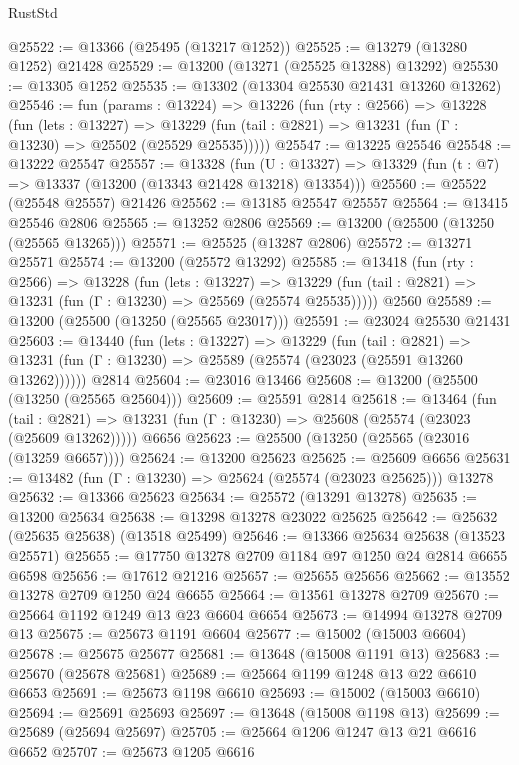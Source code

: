 \begin{lexlean}{RustStd}
\begin{coremodule}
@25522 := @13366 (@25495 (@13217 @1252))
@25525 := @13279 (@13280 @1252) @21428
@25529 := @13200 (@13271 (@25525 @13288) @13292)
@25530 := @13305 @1252
@25535 := @13302 (@13304 @25530 @21431 @13260 @13262)
@25546 := fun (params : @13224) =>
  @13226
    (fun (rty : @2566) =>
    @13228
      (fun (lets : @13227) =>
      @13229 (fun (tail : @2821) => @13231 (fun (Γ : @13230) => @25502 (@25529 @25535)))))
@25547 := @13225 @25546
@25548 := @13222 @25547
@25557 := @13328
    (fun (U : @13327) => @13329 (fun (t : @7) => @13337 (@13200 (@13343 @21428 @13218) @13354)))
@25560 := @25522 (@25548 @25557) @21426
@25562 := @13185 @25547 @25557
@25564 := @13415 @25546 @2806
@25565 := @13252 @2806
@25569 := @13200 (@25500 (@13250 (@25565 @13265)))
@25571 := @25525 (@13287 @2806)
@25572 := @13271 @25571
@25574 := @13200 (@25572 @13292)
@25585 := @13418
    (fun (rty : @2566) =>
    @13228
      (fun (lets : @13227) =>
      @13229 (fun (tail : @2821) => @13231 (fun (Γ : @13230) => @25569 (@25574 @25535)))))
    @2560
@25589 := @13200 (@25500 (@13250 (@25565 @23017)))
@25591 := @23024 @25530 @21431
@25603 := @13440
    (fun (lets : @13227) =>
    @13229
      (fun (tail : @2821) =>
      @13231 (fun (Γ : @13230) => @25589 (@25574 (@23023 (@25591 @13260 @13262))))))
    @2814
@25604 := @23016 @13466
@25608 := @13200 (@25500 (@13250 (@25565 @25604)))
@25609 := @25591 @2814
@25618 := @13464
    (fun (tail : @2821) => @13231 (fun (Γ : @13230) => @25608 (@25574 (@23023 (@25609 @13262)))))
    @6656
@25623 := @25500 (@13250 (@25565 (@23016 (@13259 @6657))))
@25624 := @13200 @25623
@25625 := @25609 @6656
@25631 := @13482 (fun (Γ : @13230) => @25624 (@25574 (@23023 @25625))) @13278
@25632 := @13366 @25623
@25634 := @25572 (@13291 @13278)
@25635 := @13200 @25634
@25638 := @13298 @13278 @23022 @25625
@25642 := @25632 (@25635 @25638) (@13518 @25499)
@25646 := @13366 @25634 @25638 (@13523 @25571)
@25655 := @17750 @13278 @2709 @1184 @97 @1250 @24 @2814 @6655 @6598
@25656 := @17612 @21216
@25657 := @25655 @25656
@25662 := @13552 @13278 @2709 @1250 @24 @6655
@25664 := @13561 @13278 @2709
@25670 := @25664 @1192 @1249 @13 @23 @6604 @6654
@25673 := @14994 @13278 @2709 @13
@25675 := @25673 @1191 @6604
@25677 := @15002 (@15003 @6604)
@25678 := @25675 @25677
@25681 := @13648 (@15008 @1191 @13)
@25683 := @25670 (@25678 @25681)
@25689 := @25664 @1199 @1248 @13 @22 @6610 @6653
@25691 := @25673 @1198 @6610
@25693 := @15002 (@15003 @6610)
@25694 := @25691 @25693
@25697 := @13648 (@15008 @1198 @13)
@25699 := @25689 (@25694 @25697)
@25705 := @25664 @1206 @1247 @13 @21 @6616 @6652
@25707 := @25673 @1205 @6616

\end{coremodule}
\end{lexlean}

